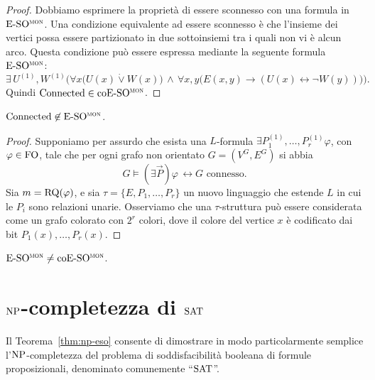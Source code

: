 \begin{proof}
  Dobbiamo esprimere la proprietà di essere sconnesso con una formula in $\operatorname{E-SO^{\normalfont\textsc{mon}}}$.
  Una condizione equivalente ad essere sconnesso è che l'insieme dei vertici possa essere partizionato in due sottoinsiemi tra i quali non vi è alcun arco. Questa condizione può essere espressa mediante la seguente formula $\operatorname{E-SO^{\normalfont\textsc{mon}}}$:
  \[ \exists \, U^{(1)}, W^{(1)} \Big( \forall x \big( U(x) \dot\lor W(x) \big) \,\wedge\, \forall x,y \big( E(x,y) \rightarrow (U(x) \leftrightarrow \lnot W(y))\big) \Big). \]
  Quindi $\operatorname{Connected} \in \operatorname{coE-SO^{\normalfont\textsc{mon}}}$.
\end{proof}






\begin{lemma}
  
\end{lemma}


\begin{lemma}
  $\operatorname{Connected} \not\in \operatorname{E-SO^{\normalfont\textsc{mon}}}$.
\end{lemma}

\begin{proof}
  Supponiamo per assurdo che esista una $L$-formula $\exists P_1^{(1)},\ldots,P_r^{(1)} \varphi$, con $\varphi\in \operatorname{FO}$, tale che per ogni grafo non orientato $G=(V^G, E^G)$ si abbia
  \[ G \models (\exists \vec{P}) \varphi \, \leftrightarrow G \text{ connesso}. \]
  Sia $m=\operatorname{RQ}(\varphi)$, e sia $\tau = \{E,P_1,\ldots,P_r\}$ un nuovo linguaggio che estende $L$ in cui le $P_i$ sono relazioni unarie.
  Osserviamo che una $\tau$-struttura può essere considerata come un grafo colorato con $2^r$ colori, dove il colore del vertice $x$ è codificato dai bit $P_1(x),\ldots,P_r(x)$.
  
  
\end{proof}



\begin{teorema}
  $\operatorname{E-SO^{\normalfont\textsc{mon}}} \neq \operatorname{coE-SO^{\normalfont\textsc{mon}}}$.
\end{teorema}




\section{\texorpdfstring{$\operatorname{NP}$}{NP}-completezza di \texorpdfstring{$\operatorname{SAT}$}{SAT}}

Il Teorema~\ref{thm:np-eso} consente di dimostrare in modo particolarmente semplice l'$\operatorname{NP}$-com\-ple\-tez\-za del problema di soddisfacibilità booleana di formule proposizionali, denominato comunemente ``$\operatorname{SAT}$''.

